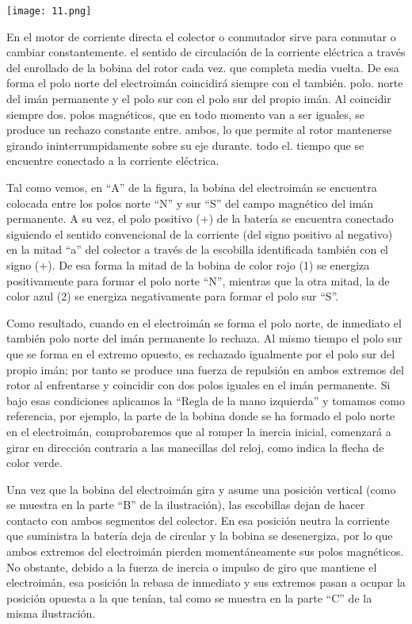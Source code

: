 \documentclass[10pt,a4paper]{article}
\begin{document}
\begin{center}
\texttt{[image: 11.png]} 
\end{center}

En el motor de corriente directa el colector o conmutador sirve para conmutar o cambiar constantemente. el sentido de circulación de la corriente eléctrica a través del enrollado de la bobina del rotor  cada  vez. que completa media vuelta. De esa forma el polo norte del electroimán coincidirá siempre con el también. polo. norte del imán permanente y el polo sur con el polo sur del propio imán. Al coincidir siempre dos. polos magnéticos, que en todo momento van a ser iguales, se produce un rechazo constante entre. ambos, lo que permite al rotor mantenerse girando ininterrumpidamente sobre su eje durante. todo el. tiempo que se encuentre conectado a la corriente eléctrica.

Tal como vemos, en “A” de la figura, la bobina del electroimán se encuentra colocada entre los polos norte “N” y sur “S” del campo magnético del imán permanente. A su vez, el polo positivo (+) de la batería se encuentra conectado siguiendo el sentido convencional de la corriente (del signo positivo al negativo) en la mitad “a” del colector a través de la escobilla identificada también con el signo (+). De esa forma la mitad de la bobina de color rojo (1) se energiza positivamente para formar el polo norte “N”, mientras que la otra mitad, la de color azul (2) se energiza negativamente para formar el polo sur “S”.

Como resultado, cuando en el electroimán se forma el polo norte, de inmediato el también polo norte del imán permanente lo rechaza. Al mismo tiempo el polo sur que se forma en el extremo opuesto, es rechazado igualmente por el polo sur del propio imán; por tanto se produce una fuerza de repulsión en ambos extremos del rotor al enfrentarse y coincidir con dos polos iguales en el imán permanente. Si bajo esas condiciones aplicamos la “Regla de la mano izquierda” y tomamos como referencia, por ejemplo, la parte de la bobina donde se ha formado el polo norte en el electroimán, comprobaremos que al romper la inercia inicial, comenzará a girar en dirección contraria a las manecillas del reloj, como indica la flecha de color verde.

Una vez que la bobina del electroimán gira y asume una posición vertical (como se muestra en la parte “B” de la ilustración), las escobillas dejan de hacer contacto con ambos segmentos del colector. En esa posición neutra la corriente que suministra la batería deja de circular y la bobina se desenergiza, por lo que ambos extremos del electroimán pierden momentáneamente sus polos magnéticos. No obstante, debido a la fuerza de inercia o impulso de giro que mantiene el electroimán, esa posición la rebasa de inmediato y sus extremos pasan a ocupar la posición opuesta a la que tenían, tal como se muestra en la parte “C” de la misma ilustración.
\end{document}
